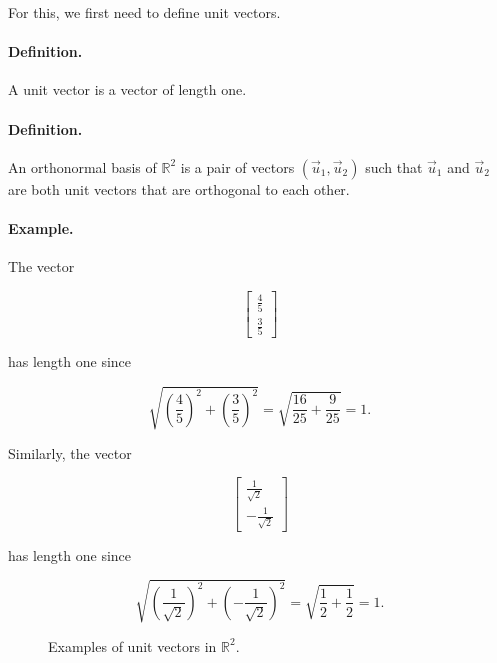 For this, we first need to define unit vectors.

\paragraph{Definition.}
A unit vector is a vector of length one.

\paragraph{Definition.}
An orthonormal basis of $\mathbb{R}^2$ is a pair of vectors
$(\vec u_1,\vec u_2)$ such that $\vec u_1$ and $\vec u_2$ are both unit vectors
that are orthogonal to each other.

\paragraph{Example.}
The vector

\[
\begin{bmatrix}
\frac45\\[2pt]
\frac35
\end{bmatrix}
\]

has length one since

\[
\sqrt{\left(\frac45\right)^2+\left(\frac35\right)^2}
=
\sqrt{\frac{16}{25}+\frac{9}{25}}
=
1.
\]

Similarly, the vector

\[
\begin{bmatrix}
\frac{1}{\sqrt{2}}\\[2pt]
-\frac{1}{\sqrt{2}}
\end{bmatrix}
\]

has length one since

\[
\sqrt{
\left(\frac{1}{\sqrt{2}}\right)^2+
\left(-\frac{1}{\sqrt{2}}\right)^2
}
=
\sqrt{\frac12+\frac12}
=
1.
\]

\begin{figure}[h]
\centering
{}
\caption{Examples of unit vectors in $\mathbb{R}^2$.}
\end{figure}

